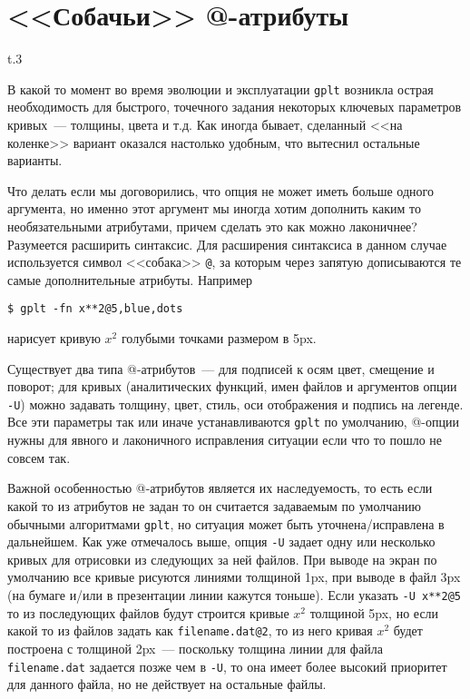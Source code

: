 \documentclass[12pt]{article}
\def\gplt{{\tt gplt}}
\begin{document}
\section{<<Собачьи>> @-атрибуты}
\begin{wrapfigure}[5]{t}{.3\textwidth}
  \vphantom{.}
  \vspace{-2.5cm}

\end{wrapfigure}
В какой то момент во время эволюции и эксплуатации \verb'gplt' возникла острая необходимость для быстрого, точечного задания некоторых ключевых
параметров кривых~--- толщины, цвета и т.д. Как иногда бывает, сделанный  <<на коленке>> вариант
оказался настолько удобным, что вытеснил остальные варианты. 

\enlargethispage{9mm}
Что делать если мы договорились, что опция не может иметь больше одного аргумента, но именно этот аргумент мы иногда хотим дополнить каким то необязательными атрибутами,
причем сделать это как можно лаконичнее?
Разумеется расширить синтаксис. Для расширения синтаксиса в данном случае используется символ <<собака>> \verb'@', за которым через запятую дописываются те самые
дополнительные атрибуты. Например
\begin{verbatim}
$ gplt -fn x**2@5,blue,dots
\end{verbatim}
нарисует кривую $x^2$ голубыми точками размером в 5px.

Существует два типа @-атрибутов~--- для подписей к осям цвет, смещение и поворот; для кривых (аналитических функций,
имен файлов и аргументов опции \verb'-U') можно задавать толщину, цвет, стиль, оси отображения и подпись на легенде.
Все эти параметры так или иначе устанавливаются \gplt{} по умолчанию, @-опции нужны для явного и лаконичного исправления ситуации если что то пошло не совсем так. 

Важной особенностью @-атрибутов является их наследуемость, то есть если какой то из атрибутов не задан то он считается задаваемым по умолчанию
обычными алгоритмами \gplt, но ситуация может быть уточнена/исправлена в дальнейшем.
Как уже отмечалось выше, опция \verb'-U' задает одну или несколько кривых для отрисовки из следующих за ней файлов. При выводе на экран по умолчанию
все кривые рисуются линиями толщиной 1px, при выводе в файл 3px (на бумаге и/или в презентации линии кажутся тоньше).
Если указать \verb'-U x**2@5' то из последующих файлов будут строится кривые $x^2$ толщиной 5px, но если какой то из файлов задать как
\verb'filename.dat@2', то из него кривая $x^2$ будет построена с толщиной 2px~--- поскольку толщина линии для файла \verb'filename.dat' задается позже чем в \verb'-U',
то она имеет более высокий приоритет для данного файла, но не действует на остальные файлы. 
\end{document}
